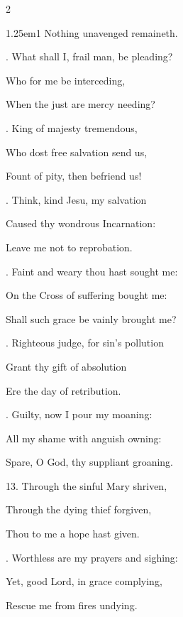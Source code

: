 \begin{multicols}{2}
\begin{hangparas}{1.25em}{1}
Nothing unavenged remaineth.\\
\par{}. What shall I, frail man, be pleading?\par\noindent
Who for me be interceding,\par\noindent
When the just are mercy needing?\\
\par{}. King of majesty tremendous,\par\noindent
Who dost free salvation send us,\par\noindent
Fount of pity, then befriend us!\\
\par{}. Think, kind Jesu, my salvation\par\noindent
Caused thy wondrous Incarnation:\par\noindent
Leave me not to reprobation.\\
\par{}. Faint and weary thou hast sought me:\par\noindent
On the Cross of suffering bought me:\par\noindent
Shall such grace be vainly brought me?\\
\par{}. Righteous judge, for sin's pollution\par\noindent
Grant thy gift of absolution\par\noindent
Ere the day of retribution.\\
\par{}. Guilty, now I pour my moaning:\par\noindent
All my shame with anguish owning:\par\noindent
Spare, O God, thy suppliant groaning.\\
\par\noindent
13. Through the sinful Mary shriven,\par\noindent
Through the dying thief forgiven,\par\noindent
Thou to me a hope hast given.\\
\par{}. Worthless are my prayers and sighing:\par\noindent
Yet, good Lord, in grace complying,\par\noindent
Rescue me from fires undying.\\
\par\noindent

\end{hangparas}
\end{multicols}
